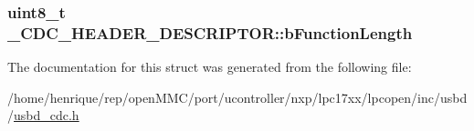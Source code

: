 \hypertarget{struct__CDC__HEADER__DESCRIPTOR_a0b88951b1e043616876d35573a6d85ed}{
\subsubsection[{b\-Function\-Length}]{\setlength{\rightskip}{0pt plus 5cm}uint8\-\_\-t \-\_\-\-C\-D\-C\-\_\-\-H\-E\-A\-D\-E\-R\-\_\-\-D\-E\-S\-C\-R\-I\-P\-T\-O\-R\-::b\-Function\-Length}}\label{struct__CDC__HEADER__DESCRIPTOR_a0b88951b1e043616876d35573a6d85ed}


The documentation for this struct was generated from the following file\-:\begin{DoxyCompactItemize}
\item 
/home/henrique/rep/open\-M\-M\-C/port/ucontroller/nxp/lpc17xx/lpcopen/inc/usbd/\hyperlink{usbd__cdc_8h}{usbd\-\_\-cdc.\-h}\end{DoxyCompactItemize}
